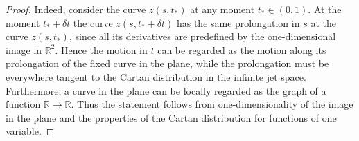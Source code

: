 \documentclass[10pt,a4paper]{amsart}
\begin{document}
\begin{proof}
 Indeed, consider the curve $z(s, t_*)$ at any moment $t_*\in (0,1)$. At the moment $t_*+\delta t$ the curve
$z(s, t_*+\delta t)$ has the same prolongation in $s$ at the curve $z(s, t_*)$, since all its derivatives are predefined
by the one-dimensional image in $\mathbb R^2$. Hence the motion in $t$ can be regarded as the motion
along its prolongation of the fixed curve in the plane, while the prolongation must be everywhere tangent to the Cartan distribution in the infinite jet space. Furthermore, a curve in the plane can be locally regarded as
the graph of a function $\mathbb R\to \mathbb R$. 
Thus the statement  follows from one-dimensionality of the image in the plane and the properties of the Cartan distribution for functions of one variable.   
\end{proof}
\end{document}
